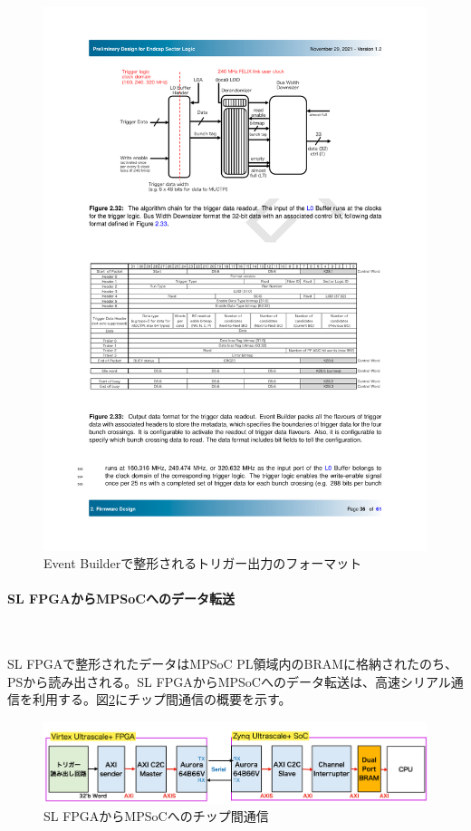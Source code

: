 \begin{itemize}
    \begin{figure} 
    \centering
    \includegraphics[width=16cm]{fig/Test/TriggerReadout_format.pdf}
    \caption[Event Builderで整形されるトリガー出力のフォーマット]{Event Builderで整形されるトリガー出力のフォーマット\cite{SLPDR}}
    \label{TriggerReadout_format}
    \end{figure}
\end{itemize}

\paragraph{SL FPGAからMPSoCへのデータ転送}　　
\par
SL FPGAで整形されたデータはMPSoC PL領域内のBRAMに格納されたのち、PSから読み出される。SL FPGAからMPSoCへのデータ転送は、高速シリアル通信を利用する。図\ref{C2C}にチップ間通信の概要を示す。
\begin{figure} 
\centering
\includegraphics[width=16cm]{fig/Test/C2C.png}
\caption[SL FPGAからMPSoCへのチップ間通信]{SL FPGAからMPSoCへのチップ間通信}
\label{C2C}
\end{figure}

